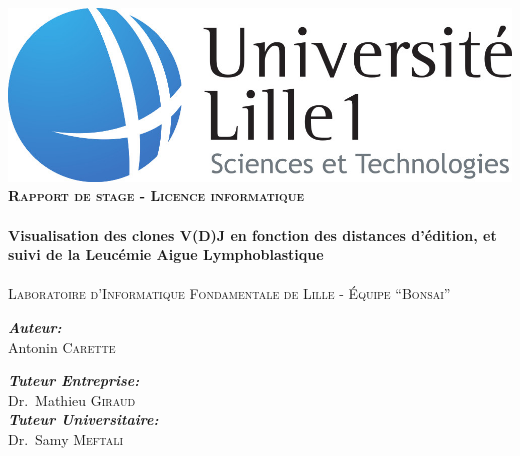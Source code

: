 \begin{titlepage}
\begin{center}

\includegraphics[scale=0.25]{img/logo-lille1.jpg}\\[2.5cm]


\textsc{\Large \bfseries Rapport de stage - Licence informatique}\\[0.5cm]

\HRule \\[0.5cm]
{ \Large \bfseries Visualisation des clones V(D)J en fonction des distances d'édition, et suivi de la Leucémie Aigue Lymphoblastique \\[0.5cm]}
\HRule \\[0.5cm]

\textsc{\large Laboratoire d'Informatique Fondamentale de Lille - Équipe ``Bonsai''}\\[2cm]

\begin{minipage}{0.4\textwidth}
\begin{flushleft} \large
\emph{\bfseries Auteur:}\\
Antonin \textsc{Carette}
\end{flushleft}
\end{minipage}
\begin{minipage}{0.4\textwidth}
\begin{flushright} \large
\emph{\bfseries Tuteur Entreprise:} \\
Dr.~Mathieu \textsc{Giraud}\\[0.2cm]
\emph{\bfseries Tuteur Universitaire:} \\
Dr.~Samy \textsc{Meftali}
\end{flushright}
\end{minipage}

\vfill


\end{center}
\end{titlepage}
